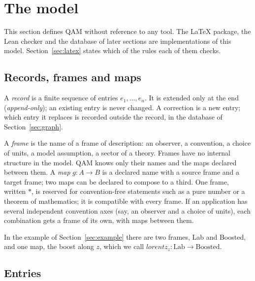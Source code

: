 \section{The model}\label{sec:model}

This section defines QAM without reference to any tool. The \LaTeX{} package, the Lean checker and the database of later sections
are implementations of this model. Section~\ref{sec:latex} states which of the rules each of them checks.

\subsection{Records, frames and maps}

\begin{definition}[Record]
A \emph{record} is a finite sequence of entries $e_1,\dots,e_n$. It is extended only at the end (\emph{append-only}); an existing
entry is never changed. A correction is a new entry; which entry it replaces is recorded outside the record, in the database of Section~\ref{sec:graph}.
\end{definition}

A \emph{frame} is the name of a frame of description: an observer, a convention, a choice of units, a model assumption, a sector of a
theory. Frames have no internal structure in the model. QAM knows only their names and the maps declared between them. A \emph{map}
$g\colon A\to B$ is a declared name with a source frame and a target frame; two maps can be declared to compose to a third. One
frame, written $*$, is reserved for convention-free statements such as a pure number or a theorem of mathematics; it is compatible
with every frame. If an application has several independent convention axes (say, an observer and a choice of units), each
combination gets a frame of its own, with maps between them.

In the example of Section~\ref{sec:example} there are two frames, Lab and Boosted, and one map, the boost along $z$, which we
call $\mathit{lorentz}_z\colon\mathrm{Lab}\to\mathrm{Boosted}$.

\subsection{Entries}

